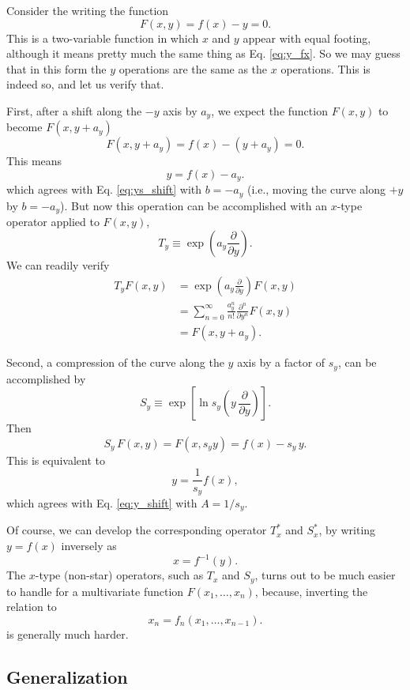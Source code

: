 \documentclass{article}
\begin{document}
Consider the writing the function
$$
F(x, y) = f(x) - y = 0.
$$
This is a two-variable function
in which $x$ and $y$ appear with equal footing,
although it means pretty much the same thing as
Eq. \eqref{eq:y_fx}.
%
So we may guess that in this form
the $y$ operations are the same as the $x$ operations.
%
This is indeed so, and let us verify that.

First, after a shift along the $-y$ axis by $a_y$, we expect
the function $F(x, y)$ to become $F(x, y + a_y)$
$$
F(x, y + a_y) = f(x) - (y + a_y) = 0.
$$
This means
$$
  y = f(x) - a_y.
$$
which agrees with Eq. \eqref{eq:ys_shift} with $b = - a_y$
(i.e., moving the curve along $+y$ by $b = -a_y$).
But now this operation can be accomplished with an $x$-type
operator applied to $F(x, y)$,
\begin{equation}
  T_y \equiv
  \exp\left(a_y \frac{ \partial } { \partial y } \right).
  \label{eq:y_shift}
\end{equation}
We can readily verify
$$
\begin{aligned}
T_y F(x, y)
&= \exp\left(a_y \frac{ \partial } { \partial y } \right) F(x, y) \\
&= \sum_{n = 0}^\infty \frac{ a_y^n }{n!}
\frac{ \partial^n } {\partial y^n} F(x, y) \\
&= F(x, y + a_y).
\end{aligned}
$$


Second,
a compression of the curve
along the $y$ axis by a factor of $s_y$,
can be accomplished by
\begin{equation}
  S_y \equiv
  \exp\left[ \ln s_y \left(
    y \, \frac{ \partial } { \partial y }
  \right) \right].
  \label{eq:y_scale}
\end{equation}
Then
$$
S_y \, F(x, y)
=
F(x, s_y y)
= f(x) - s_y \, y.
$$
This is equivalent to
$$
y = \frac{1}{s_y} f(x),
$$
which agrees with Eq. \eqref{eq:y_shift} with $A = 1/s_y$.


Of course, we can develop the corresponding
operator $T_x^*$ and $S_x^*$, by writing $y = f(x)$ inversely as
$$
x = f^{-1}(y).
$$
The $x$-type (non-star) operators, such as $T_x$ and $S_y$, turns
out to be much easier to handle for a multivariate
function $F(x_1, \dots, x_n)$, because, inverting the relation to
$$
x_n = f_n(x_1, \dots, x_{n-1}).
$$
is generally much harder.




\subsection{Generalization}
\end{document}
